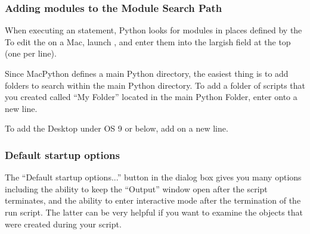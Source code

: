 \subsubsection{Adding modules to the Module Search Path
            \label{search-path}}

When executing an  statement, Python looks for modules
in places defined by the  To edit the
 on a Mac, launch , and
enter them into the largish field at the top (one per line).

Since MacPython defines a main Python directory, the easiest thing is
to add folders to search within the main Python directory. To add a
folder of scripts that you created called ``My Folder'' located in the
main Python Folder, enter  onto a new line.

To add the Desktop under OS 9 or below, add
 on a new line.

\subsubsection{Default startup options \label{defaults}}


The ``Default startup options...'' button in the
 dialog box gives you many options including
the ability to keep the ``Output'' window open after the script
terminates, and the ability to enter interactive mode after the
termination of the run script. The latter can be very helpful if you
want to examine the objects that were created during your script.



 
